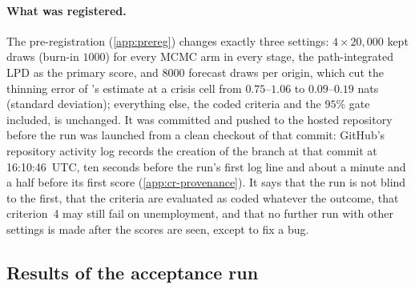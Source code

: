 \paragraph{What was registered.}
The pre-registration (\cref{app:prereg}) changes exactly three settings: $4 \times 20{,}000$ kept
draws (burn-in $1000$) for every MCMC arm in every stage, the path-integrated LPD as the primary
score, and $8000$ forecast draws per origin, which cut the thinning error of 's
estimate at a crisis cell from $0.75$--$1.06$ to $0.09$--$0.19$ nats (standard deviation);
everything else, the coded criteria and the $95\%$ gate included, is unchanged. %
It was committed and pushed to the hosted repository before the run was launched from a clean
checkout of that commit: GitHub's repository activity log records the creation of the branch at
that commit at 16:10:46~UTC, ten seconds before the run's first log line and about a minute and a
half before its first score (\cref{app:cr-provenance}). %
It says that the run is not blind to the first, that the criteria are evaluated as coded whatever
the outcome, that criterion~4 may still fail on unemployment, and that no further run with other
settings is made after the scores are seen, except to fix a bug.

\subsection{Results of the acceptance run}\label{sec:replication-results}

